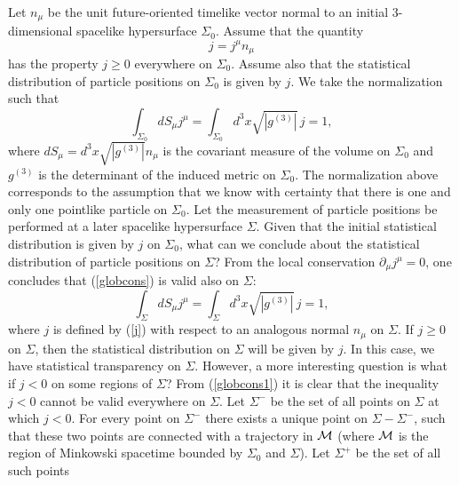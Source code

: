 \documentclass[11pt]{article}
\begin{document}
Let $n_{\mu}$ be the unit 
future-oriented timelike vector normal to 
an initial 3-dimensional spacelike
hypersurface $\Sigma_0$. Assume that the quantity 
\begin{equation}\label{j}
j=j^{\mu}n_{\mu}
\end{equation}
has the property $j\geq 0$
everywhere on $\Sigma_0$. 
%
%
Assume also                                                 
that the statistical distribution of particle positions on
$\Sigma_0$ is given by $j$.
We take the normalization such that
\begin{equation}\label{globcons}
\int_{\Sigma_0} dS_{\mu}j^{\mu}=
\int_{\Sigma_0} d^3x \sqrt{|g^{(3)}|}\, j =1,
\end{equation}
where $dS_{\mu}=d^3x \sqrt{|g^{(3)}|}n_{\mu}$ 
is the covariant measure of the volume 
on $\Sigma_0$ and $g^{(3)}$ is the determinant of the induced metric 
on $\Sigma_0$. 
The normalization above corresponds
to the assumption that we know with certainty that 
there is one and only one pointlike particle on $\Sigma_0$.
Let the measurement of particle 
positions be performed at a later spacelike hypersurface $\Sigma$.
Given that the initial statistical distribution is given by
$j$ on $\Sigma_0$, 
what can we conclude about the statistical distribution of particle
positions on $\Sigma$? From the local conservation 
$\partial_{\mu}j^{\mu}=0$, one concludes that (\ref{globcons}) 
is valid also on $\Sigma$:
\begin{equation}\label{globcons1}
\int_{\Sigma} dS_{\mu}j^{\mu}=  
\int_{\Sigma} d^3x \sqrt{|g^{(3)}|}\, j =1,
\end{equation}
where $j$ is defined by (\ref{j}) with respect to an analogous 
normal $n_{\mu}$ on $\Sigma$.
If $j\geq 0$ on $\Sigma$, then 
the statistical distribution on $\Sigma$ will be given by $j$. 
In this case, we have statistical transparency on $\Sigma$.
However, a more interesting question is what if 
$j<0$ on some regions of $\Sigma$?
From (\ref{globcons1})
it is clear that the inequality $j<0$ cannot be valid 
everywhere on $\Sigma$. Let $\Sigma^-$ be the set of all points 
on $\Sigma$ at which $j<0$.
For every point on $\Sigma^-$ there exists a unique point on 
$\Sigma-\Sigma^-$, such that these two points are connected with a 
trajectory in ${\cal M}$ (where ${\cal M}$ is the region of  
Minkowski spacetime bounded by $\Sigma_0$ and $\Sigma$). 
Let $\Sigma^+$ be the set of all such points 
\end{document}
